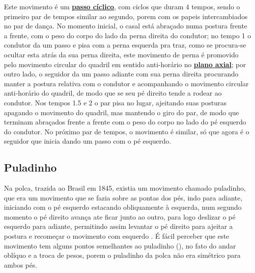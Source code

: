 Este movimento é um \hyperref[def:PassoCiclico]{\textbf{passo cíclico}}, com ciclos que duram 4 tempos, 
sendo o primeiro par de tempos similar ao segundo, porem com os papeis intercambiados no par de dança.
No momento inicial, o casal está abraçado numa postura frente a frente, 
com o peso do corpo do lado da perna direita do condutor;
no tempo 1 o condutor da um passo e pisa com a perna esquerda pra traz, 
como se procura-se ocultar esta atrás da sua perna direita, 
este movimento de perna é promovido pelo movimento circular do 
quadril em sentido anti-horário no \hyperref[def:PlanoAxial]{\textbf{plano axial}};
por outro lado, 
o seguidor da um passo adiante com sua perna direita procurando manter a postura 
relativa com o condutor e acompanhando o movimento circular anti-horário do quadril, 
de modo que se seu pé direito tende a   rodear ao condutor.
Nos tempos 1.5 e 2 o par pisa no lugar, ajeitando suas posturas apagando o movimento do quadril, 
mas mantendo o giro do par, 
de modo que terminam abraçados  frente a frente com o peso do corpo no lado do pé esquerdo do condutor.
No próximo par de tempos, o movimento é similar, só que agora é o seguidor que inicia dando um passo com o pé esquerdo. 

\subsection{Puladinho }

Na polca, trazida ao Brasil em 1845, 
existia um movimento chamado puladinho,
que era um movimento que se fazia sobre as pontas dos pés,
indo para adiante, iniciando com o pé esquerdo estacando obliquamente à esquerda,
num segundo momento o pé direito avança ate ficar junto ao outro, 
para logo deslizar o pé esquerdo para adiante, 
permitindo assim levantar o pé direito para ajeitar a postura 
e recomeçar o movimento com esquerdo \cite[pp. 58-59]{tinhorao1986pequena}.
É fácil perceber que este movimento tem alguns pontos semelhantes ao puladinho (\AnoLivro),
no fato do andar oblíquo e a troca de pesos, porem o puladinho da polca não era simétrico para ambos pés.

